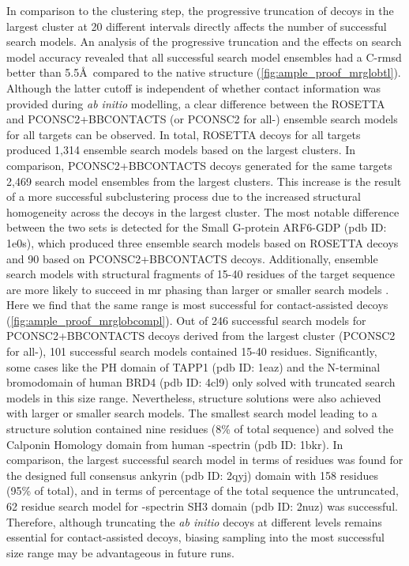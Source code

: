 In comparison to the clustering step, the progressive truncation of decoys in the largest cluster at 20 different intervals directly affects the number of successful search models. An analysis of the progressive truncation and the effects on search model accuracy revealed that all successful search model ensembles had a C\textalpha-\gls{rmsd} better than 5.5\AA\ compared to the native structure (\cref{fig:ample_proof_mrglobtl}). Although the latter cutoff is independent of whether contact information was provided during \textit{ab initio} modelling, a clear difference between the ROSETTA and PCONSC2+BBCONTACTS (or PCONSC2 for all-\textalpha) ensemble search models for all targets can be observed. In total, ROSETTA decoys for all targets produced 1,314 ensemble search models based on the largest clusters. In comparison, PCONSC2+BBCONTACTS decoys generated for the same targets 2,469 search model ensembles from the largest clusters. This increase is the result of a more successful subclustering process due to the increased structural homogeneity across the decoys in the largest cluster. The most notable difference between the two sets is detected for the Small G-protein ARF6-GDP (\gls{pdb} ID: 1e0s), which produced three ensemble search models based on ROSETTA decoys and 90 based on PCONSC2+BBCONTACTS decoys. Additionally, ensemble search models with structural fragments of 15-40 residues of the target sequence are more likely to succeed in \gls{mr} phasing than larger or smaller search models \cite{Bibby2012-lm}. Here we find that the same range is most successful for contact-assisted decoys (\cref{fig:ample_proof_mrglobcompl}). Out of 246 successful search models for PCONSC2+BBCONTACTS decoys derived from the largest cluster (PCONSC2 for all-\textalpha), 101 successful search models contained 15-40 residues. Significantly, some cases like the PH domain of TAPP1 (\gls{pdb} ID: 1eaz) and the N-terminal bromodomain of human BRD4 (\gls{pdb} ID: 4cl9) only solved with truncated search models in this size range. Nevertheless, structure solutions were also achieved with larger or smaller search models. The smallest search model leading to a structure solution contained nine residues (8\% of total sequence) and solved the Calponin Homology domain from human \textbeta-spectrin (\gls{pdb} ID: 1bkr). In comparison, the largest successful search model in terms of residues was found for the designed full consensus ankyrin (\gls{pdb} ID: 2qyj) domain with 158 residues (95\% of total), and in terms of percentage of the total sequence the untruncated, 62 residue search model for \textalpha-spectrin SH3 domain (\gls{pdb} ID: 2nuz) was successful. Therefore, although truncating the \textit{ab initio} decoys at different levels remains essential for contact-assisted decoys, biasing sampling into the most successful size range may be advantageous in future runs.

